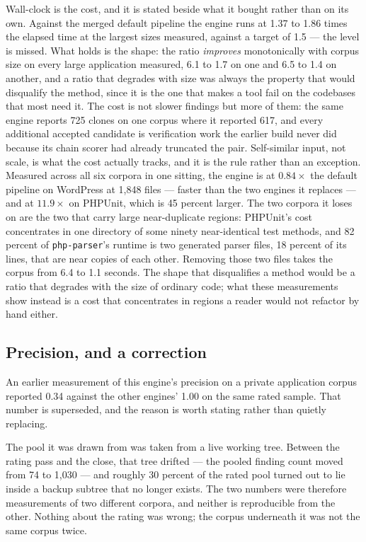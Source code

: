 \documentclass[10pt,a4paper]{article}
\newcounter{prop}[section]
\begin{document}
Wall-clock is the cost, and it is stated beside what it bought rather than on its own. Against the
merged default pipeline the engine runs at 1.37 to 1.86 times the elapsed time at the largest sizes
measured, against a target of 1.5 --- the level is missed. What holds is the shape: the ratio
\emph{improves} monotonically with corpus size on every large application measured, 6.1 to 1.7 on
one and 6.5 to 1.4 on another, and a ratio that degrades with size was always the property that
would disqualify the method, since it is the one that makes a tool fail on the codebases that most
need it. The cost is not slower findings but more of them: the same engine reports 725 clones on one
corpus where it reported 617, and every additional accepted candidate is verification work the
earlier build never did because its chain scorer had already truncated the pair. Self-similar input, not scale, is what the cost
actually tracks, and it is the rule rather than an exception. Measured across all six corpora in one
sitting, the engine is at $0.84\times$ the default pipeline on WordPress at 1,848 files --- faster
than the two engines it replaces --- and at $11.9\times$ on PHPUnit, which is 45 percent larger. The
two corpora it loses on are the two that carry large near-duplicate regions: PHPUnit's cost
concentrates in one directory of some ninety near-identical test methods, and 82 percent of
\texttt{php-parser}'s runtime is two generated parser files, 18 percent of its lines, that are near
copies of each other. Removing those two files takes the corpus from 6.4 to 1.1 seconds. The shape
that disqualifies a method would be a ratio that degrades with the size of ordinary code; what these
measurements show instead is a cost that concentrates in regions a reader would not refactor by hand
either.

\subsection{Precision, and a correction}
\label{sec:precision-correction}

An earlier measurement of this engine's precision on a private application corpus reported 0.34
against the other engines' 1.00 on the same rated sample. That number is superseded, and the
reason is worth stating rather than quietly replacing.

The pool it was drawn from was taken from a live working tree. Between the rating pass and the
close, that tree drifted --- the pooled finding count moved from 74 to 1,030 --- and roughly 30
percent of the rated pool turned out to lie inside a backup subtree that no longer exists. The two
numbers were therefore measurements of two different corpora, and neither is reproducible from the
other. Nothing about the rating was wrong; the corpus underneath it was not the same corpus twice.
\end{document}
